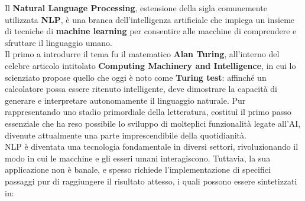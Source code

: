 Il \textbf{Natural Language Processing}, estensione della sigla comunemente utilizzata \textbf{NLP}, è una branca dell'intelligenza artificiale che impiega un insieme di tecniche di \textbf{machine learning} per consentire alle macchine di comprendere e sfruttare il linguaggio umano. \vspace{7pt} \\
Il primo a introdurre il tema fu il matematico \textbf{Alan Turing}, all'interno del celebre articolo intitolato \textbf{Computing Machinery and Intelligence}, in cui lo scienziato propose quello che oggi è noto come \textbf{Turing test}: affinché un calcolatore possa essere ritenuto intelligente, deve dimostrare la capacità di generare e interpretare autonomamente il linguaggio naturale. Pur rappresentando uno stadio primordiale della letteratura, costituì il primo passo essenziale che ha reso possibile lo sviluppo di molteplici funzionalità legate all'AI, divenute attualmente una parte imprescendibile della quotidianità. \vspace{7pt} \\
NLP è diventata una tecnologia fondamentale in diversi settori, rivoluzionando il modo in cui le macchine e gli esseri umani interagiscono. Tuttavia, la sua applicazione non è banale, e spesso richiede l'implementazione di specifici passaggi pur di raggiungere il risultato attesso, i quali possono essere sintetizzati in:
